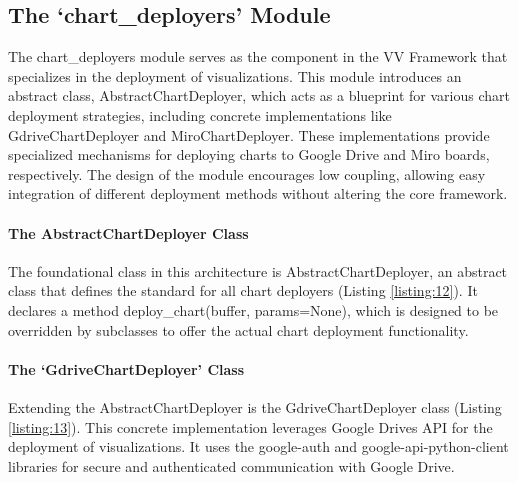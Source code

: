 \subsection{The `chart\_deployers'
Module}\label{the-chart_deployers-module}

The chart\_deployers module serves as the component in the VV Framework
that specializes in the deployment of visualizations. This module
introduces an abstract class, AbstractChartDeployer, which acts as a
blueprint for various chart deployment strategies, including concrete
implementations like GdriveChartDeployer and MiroChartDeployer. These
implementations provide specialized mechanisms for deploying charts to
Google Drive and Miro boards, respectively. The design of the module
encourages low coupling, allowing easy integration of different
deployment methods without altering the core framework.

\paragraph{The AbstractChartDeployer
Class}\label{the-abstractchartdeployer-class}

The foundational class in this architecture is AbstractChartDeployer, an
abstract class that defines the standard for all chart deployers
(Listing \ref{listing:12}). It declares a method deploy\_chart(buffer, params=None),
which is designed to be overridden by subclasses to offer the actual
chart deployment functionality.


\paragraph{The `GdriveChartDeployer'
Class}\label{the-gdrivechartdeployer-class}

Extending the AbstractChartDeployer is the GdriveChartDeployer class
(Listing \ref{listing:13}). This concrete implementation leverages Google
Drive\textquotesingle s API for the deployment of visualizations. It
uses the google-auth and google-api-python-client libraries for secure
and authenticated communication with Google Drive.

